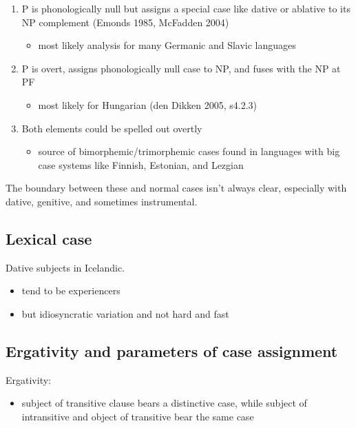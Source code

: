 \begin{enumerate}
  \item P is phonologically null but assigns a special case like dative or ablative to its NP complement (Emonds 1985, McFadden 2004)
  \begin{itemize}
    \item most likely analysis for many Germanic and Slavic languages
  \end{itemize}
  \item P is overt, assigns phonologically null case to NP, and fuses with the NP at PF
  \begin{itemize}
    \item most likely for Hungarian (den Dikken 2005, s4.2.3)
  \end{itemize}
  \item Both elements could be spelled out overtly
  \begin{itemize}
    \item source of bimorphemic/trimorphemic cases found in languages with big case systems like Finnish, Estonian, and Lezgian
  \end{itemize}
\end{enumerate}

The boundary between these and normal cases isn't always clear, especially with dative, genitive, and sometimes instrumental.

\subsection*{Lexical case}

Dative subjects in Icelandic.

\begin{itemize}
  \item tend to be experiencers
  \item but idiosyncratic variation and not hard and fast
\end{itemize}

\subsection*{Ergativity and parameters of case assignment}

Ergativity:

\begin{itemize}
  \item subject of transitive clause bears a distinctive case, while subject of intransitive and object of transitive bear the same case
\end{itemize}

